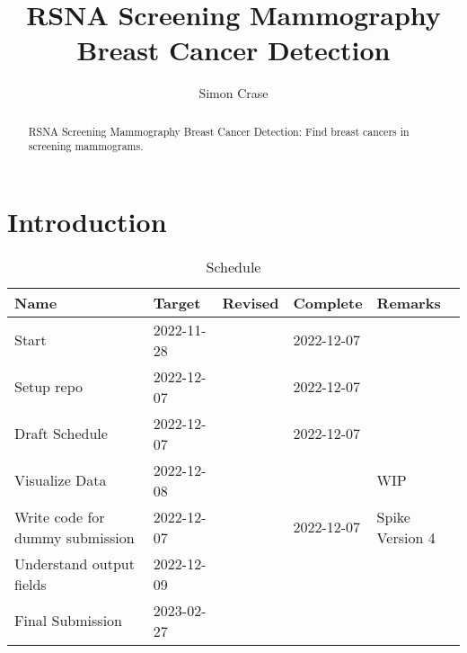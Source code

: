 \documentclass[]{article}
\title{RSNA Screening Mammography Breast Cancer Detection}
\author{Simon Crase}
\begin{document}
\maketitle

\begin{abstract}
RSNA Screening Mammography Breast Cancer Detection: Find breast cancers in screening mammograms. \cite{rsna-breast-cancer-detection}
\end{abstract}

\setcounter{tocdepth}{2}
\tableofcontents
\listoffigures
\listoftables

\section{Introduction}
\begin{table}[H]
	\begin{center}
		\caption{Schedule}
		\begin{tabular}{|l|l|l|l|l|} \hline
			Name&Target&Revised&Complete&Remarks \\  \hline
			Start&2022-11-28&&2022-12-07&\\ 		 \hline
			Setup repo&2022-12-07&&2022-12-07&\\ 		 \hline
			Draft Schedule&2022-12-07&&2022-12-07&\\ 		 \hline
			Visualize Data&2022-12-08&&&WIP\\ 		 \hline
			Write code for dummy submission&2022-12-07&&2022-12-07&Spike Version 4\\ 		 \hline
			Understand output fields&2022-12-09&&&\\ \hline
			Final Submission&2023-02-27&&&\\ 		 \hline
		\end{tabular}
	\end{center}
\end{table}
\end{document}
